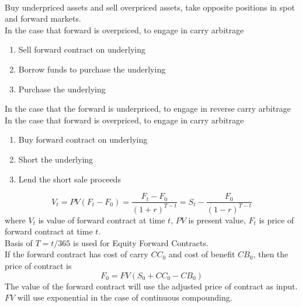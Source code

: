 \begin{remark} \\
Buy underpriced assets and sell overpriced assets, take opposite positions in spot and forward markets.\\
In the case that forward is overpriced, to engage in carry arbitrage
\begin{enumerate}[label=\roman*.]
\setlength{\itemsep}{0pt}
\item Sell forward contract on underlying
\item Borrow funds to purchase the underlying
\item Purchase the underlying
\end{enumerate}
In the case that the forward is underpriced, to engage in reverse carry arbitrage
In the case that forward is overpriced, to engage in carry arbitrage
\begin{enumerate}[label=\roman*.]
\setlength{\itemsep}{0pt}
\item Buy forward contract on underlying
\item Short the underlying
\item Lend the short sale proceeds
\end{enumerate}
\end{remark}

\begin{remark} 
\begin{equation}
V_t = PV(F_t - F_0) = \frac{F_t - F_0}{(1+r)^{T-t}} = S_t - \frac{F_0}{(1-r)^{T-t}} \nonumber
\end{equation}
where $V_t$ is value of forward contract at time $t$, $PV$ is present value, $F_t$ is price of forward contract at time $t$.\\
Basis of $T = t/365$ is used for Equity Forward Contracts.\\
If the forward contract has cost of carry $CC_0$ and cost of benefit $CB_0$, then the price of contract is
\begin{equation}
F_0 = FV(S_0 + CC_0 - CB_0) \nonumber
\end{equation}
The value of the forward contract will use the adjusted price of contract as input.\\
$FV$ will use exponential in the case of continuous compounding.
\end{remark}


